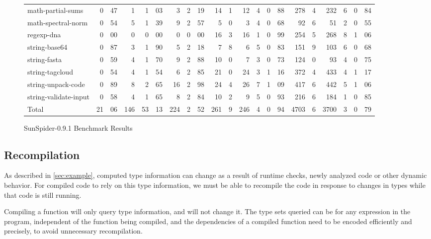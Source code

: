 \begin{figure*}[ht]
\begin{tabular}{lr@{.}lrr@{.}lrr@{.}lr@{.}lr@{.}lr@{.}lr@{.}lr@{.}lr@{.}l}
math-partial-sums        & 0&47 & 1   & 1&03 & 3  & 2&19
    & 14&1 & 12&4 & 0&88  & 278&4 & 232&6 & 0&84 \\
math-spectral-norm       & 0&54 & 5   & 1&39 & 9  & 2&57
    & 5&0  & 3&4 & 0&68   & 92&6  & 51&2  & 0&55 \\
regexp-dna               & 0&00 & 0   & 0&00 & 0    & 0&00
    & 16&3 & 16&1 & 0&99  & 254&5 & 268&8 & 1&06 \\
string-base64            & 0&87 & 3   & 1&90 & 5   & 2&18
    & 7&8  & 6&5 & 0&83   & 151&9 & 103&6 & 0&68 \\
string-fasta             & 0&59 & 4   & 1&70 & 9   & 2&88
    & 10&0 & 7&3 & 0&73   & 124&0 & 93&4  & 0&75 \\
string-tagcloud          & 0&54 & 4   & 1&54 & 6  & 2&85
    & 21&0 & 24&3 & 1&16 & 372&4 & 433&4 & 1&17 \\
string-unpack-code       & 0&89 & 8   & 2&65 & 16 & 2&98
    & 24&4 & 26&7 & 1&09 & 417&6 & 442&5 & 1&06 \\
string-validate-input    & 0&58 & 4   & 1&65 & 8  & 2&84
    & 10&2 & 9&5 & 0&93   & 216&6 & 184&1 & 0&85 \\

\midrule

Total                  & 21&06 & 146 & 53&13 & 224 & 2&52
    & 261&9 & 246&4 & 0&94 & 4703&6 & 3700&3 & 0&79 \\

\bottomrule

\end{tabular}
\nocaptionrule \caption{SunSpider-0.9.1 Benchmark Results}
\label{fig:sunspider}
\end{figure*}

\subsection{Recompilation}
\label{sec:recompilation}

As described in \Section\ref{sec:example}, computed type information can change as
a result of runtime checks, newly analyzed code or other dynamic behavior.
For compiled code to rely on this type information, we must be able
to recompile the code in response to changes in types while that code is
still running.

Compiling a function will only query type information, and will not change it.
The type sets queried can be for any expression %
in the program,
independent of the function being compiled,
and the dependencies of a compiled function need to be encoded efficiently
and precisely, to avoid unnecessary recompilation.


